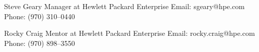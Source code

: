 

\begin{cvskills}

  \cvskill
    {Steve Geary} %
    {Manager at Hewlett Packard Enterprise Email: sgeary@hpe.com Phone: (970) 310--0440} %

  \cvskill
    {Rocky Craig} %
    {Mentor at Hewlett Packard Enterprise Email: rocky.craig@hpe.com Phone: (970) 898--3550} %
\end{cvskills}
